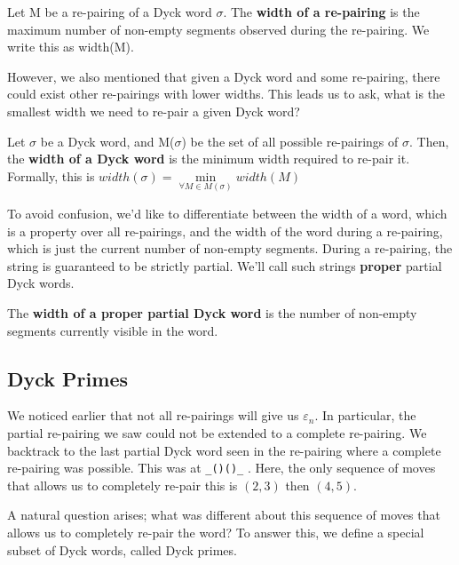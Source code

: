 \begin{definition}
    Let M be a re-pairing of a Dyck word $\sigma$. The \textbf{width of a re-pairing} is the maximum number of non-empty segments observed during the re-pairing. We write this as width(M).
\end{definition}

However, we also mentioned that given a Dyck word and some re-pairing, there could exist other re-pairings with lower widths. This leads us to ask, what is the smallest width we need to re-pair a given Dyck word? 

\begin{definition}
    Let $\sigma$ be a Dyck word, and M($\sigma$) be the set of all possible re-pairings of $\sigma$. Then, the \textbf{width of a Dyck word} is the minimum width required to re-pair it. 
    \\ Formally, this is $width(\sigma)=\min\limits_{\forall M\in M(\sigma)}width(M)$ 
\end{definition}

To avoid confusion, we'd like to differentiate between the width of a word, which is a property over all re-pairings, and the width of the word during a re-pairing, which is just the current number of non-empty segments. During a re-pairing, the string is guaranteed to be strictly partial. We'll call such strings \textbf{proper} partial Dyck words. 

\begin{definition}
    The \textbf{width of a proper partial Dyck word} is the number of non-empty segments currently visible in the word.
\end{definition}

\subsection{Dyck Primes}
We noticed earlier that not all re-pairings will give us $\varepsilon_n$. In particular, the partial re-pairing we saw could not be extended to a complete re-pairing. We backtrack to the last partial Dyck word seen in the re-pairing where a complete re-pairing was possible. This was at \texttt{\string_()()\string_} . Here, the only sequence of moves that allows us to completely re-pair this is $(2,3)$ then $(4,5)$. 

A natural question arises; what was different about this sequence of moves that allows us to completely re-pair the word? To answer this, we define a special subset of Dyck words, called Dyck primes. 

